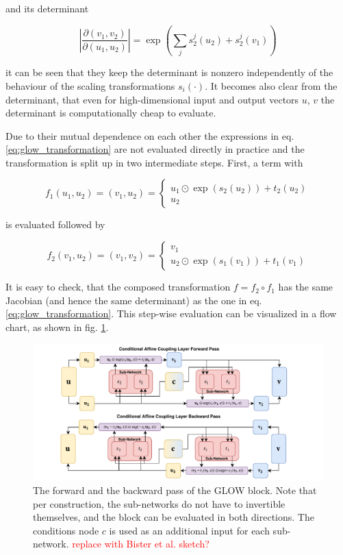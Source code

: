 and its determinant

\begin{equation*}
	\left|\frac{\partial (v_1, v_2)}{\partial (u_1, u_2)} \right| = \exp \left(\sum_j s^j_2(u_2) + s^j_2(v_1) \right)
\end{equation*}

it can be seen that they keep the determinant is nonzero independently of the behaviour of the scaling transformations $s_i(\cdot)$. It becomes also clear from the determinant, that even for high-dimensional input and output vectors $u$, $v$ the determinant is computationally cheap to evaluate.

Due to their mutual dependence on each other the expressions in eq. \ref{eq:glow_transformation} are not evaluated directly in practice and the transformation is split up in two intermediate steps. First, a term with

\begin{equation*}
	f_1(u_1, u_2) = (v_1, u_2) = \begin{cases}
		u_1 \odot \exp(s_2(u_2)) + t_2(u_2) \\
		u_2
	\end{cases}
\end{equation*}

is evaluated followed by

\begin{equation*}
	f_2(v_1, u_2) = (v_1, v_2) = \begin{cases}
		v_1 \\
		 u_2 \odot \exp(s_1(v_1)) + t_1(v_1)
	\end{cases}
\end{equation*}

It is easy to check, that the composed transformation $f = f_2 \circ f_1$ has the same Jacobian (and hence the same determinant) as the one in eq. \ref{eq:glow_transformation}. This step-wise evaluation can be visualized in a flow chart, as shown in fig. \ref{fig:glow}.

\begin{figure}[h!]
	\centering
	\includegraphics[width=\linewidth]{figures/neural_networks/glow.pdf}
	\caption{The forward and the backward pass of the GLOW block. Note that per construction, the sub-networks do not have to invertible themselves, and the block can be evaluated in both directions. The conditions node $c$ is used as an additional input for each sub-network. \cite{Ksoll_2020} \textcolor{red}{replace with Bister et al. sketch?}}
	\label{fig:glow}
\end{figure}

